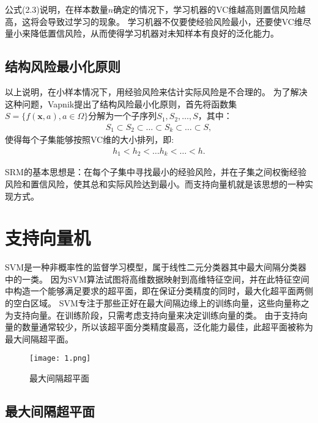 公式(2.3)说明，在样本数量$n$确定的情况下，学习机器的VC维越高则置信风险越高，这将会导致过学习的现象。
学习机器不仅要使经验风险最小，还要使VC维尽量小来降低置信风险，从而使得学习机器对未知样本有良好的泛化能力。

\subsection{结构风险最小化原则}

以上说明，在小样本情况下，用经验风险来估计实际风险是不合理的。
为了解决这种问题，Vapnik提出了结构风险最小化原则，首先将函数集$S=\{f(\mathbf{x},a),a\in\Omega\}$分解为一个子序列$S_1, S_2, \ldots , S$，其中：
\begin{align}
    S_1\subset S_2\subset \ldots \subset S_k\subset \ldots \subset S,
\end{align}
使得每个子集能够按照VC维的大小排列，即:
\begin{align}
    h_1 < h_2 < \ldots h_k < \ldots < h.
\end{align}

SRM的基本思想是：在每个子集中寻找最小的经验风险，并在子集之间权衡经验风险和置信风险，使其总和实际风险达到最小。而支持向量机就是该思想的一种实现方式。

\section{支持向量机}

SVM是一种非概率性的监督学习模型，属于线性二元分类器其中最大间隔分类器中的一类。
因为SVM算法试图将高维数据映射到高维特征空间，并在此特征空间中构造一个能够满足要求的超平面，即在保证分类精度的同时，最大化超平面两侧的空白区域。
SVM专注于那些正好在最大间隔边缘上的训练向量，这些向量称之为支持向量。在训练阶段，只需考虑支持向量来决定训练向量的类。
由于支持向量的数量通常较少，所以该超平面分类精度最高，泛化能力最佳，此超平面被称为最大间隔超平面。

\begin{figure}[ht]
    \centering
    \texttt{[image: 1.png]}
    \caption{最大间隔超平面}
\end{figure}

\subsection{最大间隔超平面}

